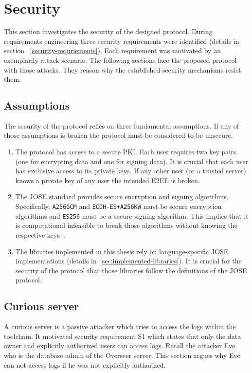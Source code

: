 \documentclass[../main.tex]{subfiles}
\begin{document}
\section{Security}
\label{sec:evaluation-sec}

This section investigates the security of the designed protocol.
During requirements engineering three security requirements were identified (details in section ~\ref{security-requriements}).
Each requirement was motivated by an exemplarily attack scenario.
The following sections face the proposed protocol with those attacks.
They reason why the established security mechanisms resist them.

\subsection{Assumptions}

The security of the protocol relies on three fundamental assumptions.
If any of those assumptions is broken the protocol must be considered to be unsecure.

\begin{enumerate}
    \item 
    The protocol has access to a secure PKI.
    Each user requires two key pairs (one for encrypting data and one for signing data).
    It is crucial that each user has exclusive access to its private keys.
    If any other user (or a trusted server) knows a private key of any user the intended E2EE is broken.
    \item 
    The JOSE standard provides secure encryption and signing algorithms.
    Specifically, \verb|A256GCM| and \verb|ECDH-ES+A256KW| must be secure encryption algorithms and \verb|ES256| must be a secure signing algorithm.
    This implies that it is computational infeasible to break those algorithms without knowing the respective keys~\cite{Katz2020}.
    \item 
    The libraries implemented in this thesis rely on language-specific JOSE implementations (details in~\ref{sec:implemented-libraries}).
    It is crucial for the security of the protocol that those libraries follow the definitions of the JOSE protocol.
\end{enumerate}

\subsection{Curious server}
A curious server is a passive attacker which tries to access the logs within the toolchain.
It motivated security requirement S1 which states that only the data owner and explicitly authorized users can access logs.
Recall the attacker Eve who is the database admin of the Overseer server.
This section argues why Eve can not access logs if he was not explicitly authorized.
\end{document}

